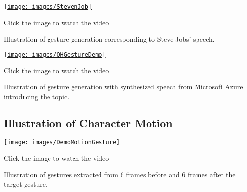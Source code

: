 {
	\begin{center}
		\centering
		\href{https://www.youtube.com/watch?v=B6nv1kQmi-Q}{%
			\texttt{[image: images/StevenJob]}}
		
		{\tiny Click the image to watch the video}
	\end{center}
}

Illustration of gesture generation corresponding to Steve Jobs’ speech.

{
	\begin{center}
		\centering
		\href{https://youtu.be/yLwXdm7UgPE}{%
			\texttt{[image: images/OHGestureDemo]}}
		
		{\tiny Click the image to watch the video}
	\end{center}
}

Illustration of gesture generation with synthesized speech from Microsoft Azure introducing the topic.

\subsection{Illustration of Character Motion}

\begin{center}
	{
		\centering
		\href{https://www.youtube.com/watch?v=9IIIZP3EJLg}{%
			\texttt{[image: images/DemoMotionGesture]}}
		
		{\tiny Click the image to watch the video}
	}
\end{center}
Illustration of gestures extracted from 6 frames before and 6 frames after the target gesture.
